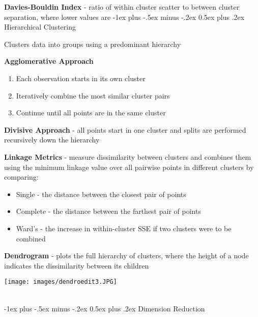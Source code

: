\documentclass[10pt,landscape]{article}
\makeatletter
\renewcommand{\section}{\@startsection{section}{1}{0mm}%
                                {-1ex plus -.5ex minus -.2ex}%
                                {0.5ex plus .2ex}%
                                {\normalfont\large\bfseries}}
\renewcommand{\subsection}{\@startsection{subsection}{2}{0mm}%
                                {-1ex plus -.5ex minus -.2ex}%
                                {0.5ex plus .2ex}%
                                {\normalfont\normalsize\bfseries}}
\makeatother
\begin{document}
\begin{multicols}{3}
\textbf{Davies-Bouldin Index} - ratio of within cluster scatter to between cluster separation, where lower values are 
\subsection{Hierarchical Clustering}

Clusters data into groups using a predominant hierarchy 

\textbf{Agglomerative Approach}
\begin{enumerate}[leftmargin=5mm]
\itemsep -.4mm 
\item Each observation starts in its own cluster
\item Iteratively combine the most similar cluster pairs 
\item Continue until all points are in the same cluster
\end{enumerate}

\textbf{Divisive Approach} - all points start in one cluster and splits are performed recursively down the hierarchy

\textbf{Linkage Metrics} - measure dissimilarity between clusters and combines them using the minimum linkage value over all pairwise points in different clusters by comparing:
\begin{itemize}[label={--},leftmargin=4mm]
\itemsep -.4mm 
\item Single - the distance between the closest pair of points
\item Complete - the distance between the farthest pair of points
\item Ward's - the increase in within-cluster SSE if two clusters were to be combined 
\end{itemize}
\textbf{Dendrogram} - plots the full hierarchy of clusters, where the height of a node indicates the dissimilarity between its children 
\begin{center}
    \texttt{[image: images/dendroedit3.JPG]}
\end{center}

\columnbreak
\textcolor{white}{.}\vspace{-5mm}\\ %
\section{Dimension Reduction}

\end{multicols}
\end{document}
